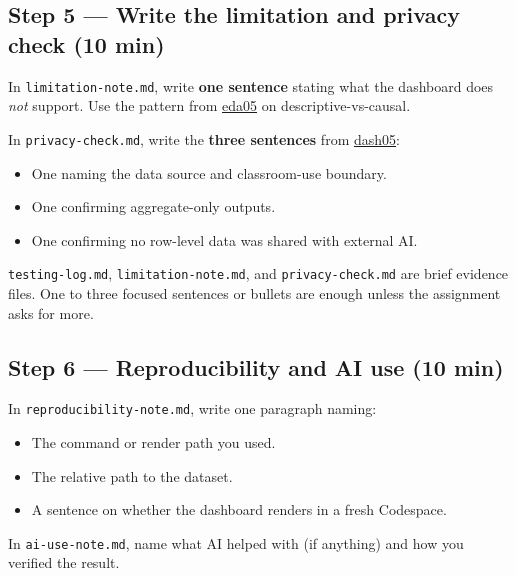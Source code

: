 \documentclass[
  letterpaper,
  DIV=11,
  numbers=noendperiod,
  oneside]{scrreprt}
\providecommand{\tightlist}{%
  \setlength{\itemsep}{0pt}\setlength{\parskip}{0pt}}
\begin{document}
\subsection*{Step 5 --- Write the limitation and privacy check (10
min)}\label{step-5-write-the-limitation-and-privacy-check-10-min}

In \texttt{limitation-note.md}, write \textbf{one sentence} stating what
the dashboard does \emph{not} support. Use the pattern from
\hyperref[four-audit-categories-for-ai-drafted-eda]{eda05} on
descriptive-vs-causal.

In \texttt{privacy-check.md}, write the \textbf{three sentences} from
\hyperref[testing-privacy-safe-publishing-and-the-shiny-demo]{dash05}:

\begin{itemize}
\tightlist
\item
  One naming the data source and classroom-use boundary.
\item
  One confirming aggregate-only outputs.
\item
  One confirming no row-level data was shared with external AI.
\end{itemize}

\texttt{testing-log.md}, \texttt{limitation-note.md}, and
\texttt{privacy-check.md} are brief evidence files. One to three focused
sentences or bullets are enough unless the assignment asks for more.

\subsection*{Step 6 --- Reproducibility and AI use (10
min)}\label{step-6-reproducibility-and-ai-use-10-min}

In \texttt{reproducibility-note.md}, write one paragraph naming:

\begin{itemize}
\tightlist
\item
  The command or render path you used.
\item
  The relative path to the dataset.
\item
  A sentence on whether the dashboard renders in a fresh Codespace.
\end{itemize}

In \texttt{ai-use-note.md}, name what AI helped with (if anything) and
how you verified the result.
\end{document}
